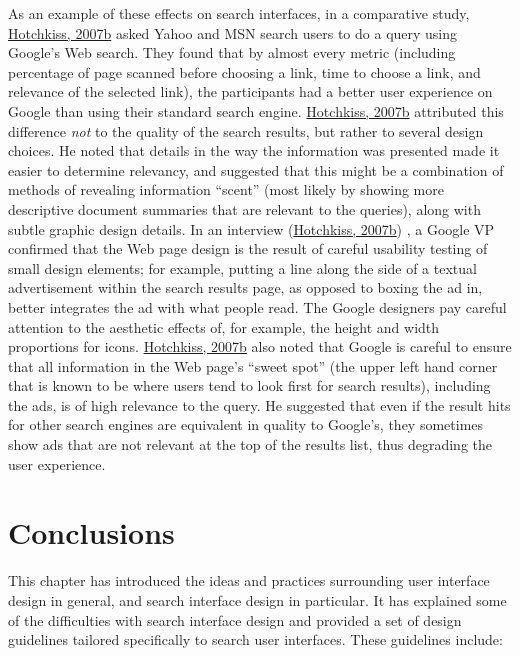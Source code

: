 \documentclass[sigconf,nonacm,screen,pbalance]{acmart}
\begin{document}
As an example of these effects on search interfaces, in a comparative study, \href{https://searchuserinterfaces.com/book/sui_references.html#hotchkiss07}{Hotchkiss, 2007b} asked Yahoo and MSN search users to do a query
using Google's Web search. They found that by almost every metric (including percentage of page scanned
before choosing a link, time to choose a link, and relevance of the selected link), the participants had a
better user experience on Google than using their standard search engine. \href{https://searchuserinterfaces.com/book/sui_references.html#hotchkiss07}{Hotchkiss, 2007b} attributed this difference {\em  not} to the
quality of the search results, but rather to several design choices. He noted that details in the way the
information was presented made it easier to determine relevancy, and suggested that this might be a
combination of methods of revealing information ``scent'' (most likely by showing more descriptive document
summaries that are relevant to the queries), along with subtle graphic design details. In an interview (\href{https://searchuserinterfaces.com/book/sui_references.html#hotchkiss07}{Hotchkiss, 2007b}) , a Google VP confirmed that the Web page design
is the result of careful usability testing of small design elements; for example, putting a line along the
side of a textual advertisement within the search results page, as opposed to boxing the ad in, better
integrates the ad with what people read. The Google designers pay careful attention to the aesthetic
effects of, for example, the height and width proportions for icons. \href{https://searchuserinterfaces.com/book/sui_references.html#hotchkiss07}{Hotchkiss, 2007b} also noted that Google is careful to ensure that
all information in the Web page's ``sweet spot'' (the upper left hand corner that is known to be where users
tend to look first for search results), including the ads, is of high relevance to the query. He suggested
that even if the result hits for other search engines are equivalent in quality to Google's, they
sometimes show ads that are not relevant at the top of the results list, thus degrading the user
experience.

\section{Conclusions}

This chapter has introduced the ideas and practices surrounding user interface design in general, and
search interface design in particular. It has explained some of the difficulties with search interface
design and provided a set of design guidelines tailored specifically to search user interfaces. These
guidelines include:
\end{document}
